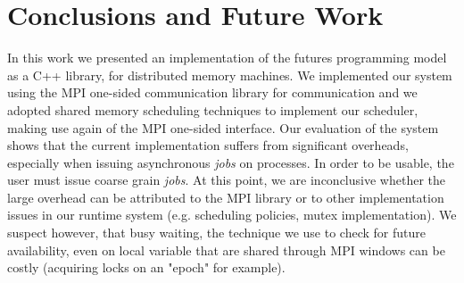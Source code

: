 \chapter{Conclusions and Future Work}
\label{chap:conclusion}
In this work we presented an implementation of the futures programming model as a C++ library,
for distributed memory machines.  We implemented our system using the MPI one-sided communication
library for communication and we adopted shared memory scheduling techniques to implement 
our scheduler, making use again of the MPI one-sided interface.  Our evaluation of the system shows
that the current implementation suffers from significant overheads, especially when issuing asynchronous
\emph{jobs} on processes. In order to be usable, the user must issue coarse grain \emph{jobs}.  At this
point, we are inconclusive whether the large overhead can be attributed to the MPI library or to other
implementation issues in our runtime system (e.g. scheduling policies, mutex implementation).  We suspect
however, that busy waiting, the technique we use to check for future availability, 
even on local variable that are shared through MPI windows can be costly (acquiring locks on an "epoch" for example).


